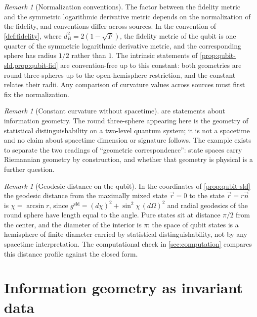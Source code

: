 \documentclass[11pt,letterpaper]{article}
\theoremstyle{definition}
\theoremstyle{remark}
\newtheorem{remark}[theorem]{Remark}
\begin{document}
\begin{remark}[Normalization conventions]
\label{rem:conventions}
The factor between the fidelity metric and the symmetric logarithmic derivative metric depends on the normalization of the fidelity, and conventions differ across sources. In the convention of \cref{def:fidelity}, where $d_B^2 = 2(1-\sqrt{F})$, the fidelity metric of the qubit is one quarter of the symmetric logarithmic derivative metric, and the corresponding sphere has radius $1/2$ rather than $1$. The intrinsic statements of \cref{prop:qubit-sld,prop:qubit-fid} are convention-free up to this constant: both geometries are round three-spheres up to the open-hemisphere restriction, and the constant relates their radii. Any comparison of curvature values across sources must first fix the normalization.
\end{remark}

\begin{remark}[Constant curvature without spacetime]
\label{rem:sphere}
 are statements about information geometry. The round three-sphere appearing here is the geometry of statistical distinguishability on a two-level quantum system; it is not a spacetime and no claim about spacetime dimension or signature follows. The example exists to separate the two readings of ``geometric correspondence'': state spaces carry Riemannian geometry by construction, and whether that geometry is physical is a further question.
\end{remark}

\begin{remark}[Geodesic distance on the qubit]
\label{rem:distance}
In the coordinates of \cref{prop:qubit-sld} the geodesic distance from the maximally mixed state $\vec{r} = 0$ to the state $\vec{r} = r \vec{n}$ is $\chi = \arcsin r$, since $g^{\mathrm{sld}} = (d\chi)^2 + \sin^2\!\chi \, (d\Omega)^2$ and radial geodesics of the round sphere have length equal to the angle. Pure states sit at distance $\pi/2$ from the center, and the diameter of the interior is $\pi$: the space of qubit states is a hemisphere of finite diameter carried by statistical distinguishability, not by any spacetime interpretation. The computational check in \cref{sec:computation} compares this distance profile against the closed form.
\end{remark}

\section{Information geometry as invariant data}
\label{sec:invariants}
\end{document}
